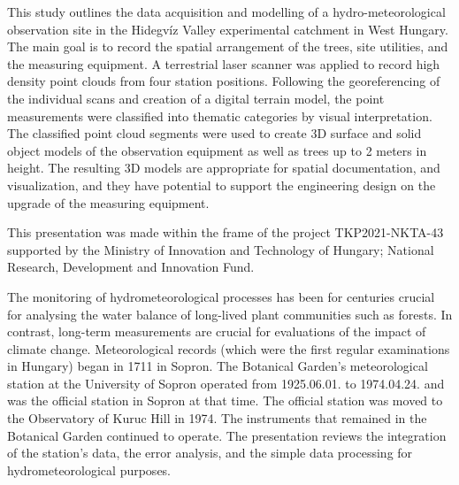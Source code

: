 \noindent

This study outlines the data acquisition and modelling of a hydro-meteorological observation site in the Hidegvíz Valley experimental catchment in West Hungary. The main goal is to record the spatial arrangement of the trees, site utilities, and the measuring equipment. A terrestrial laser scanner was applied to record high density point clouds from four station positions. Following the georeferencing of the individual scans and creation of a digital terrain model, the point measurements were classified into thematic categories by visual interpretation. The classified point cloud segments were used to create 3D surface and solid object models of the observation equipment as well as trees up to 2 meters in height. The resulting 3D models are appropriate for spatial documentation, and visualization, and they have potential to support the engineering design on the upgrade of the measuring equipment.

This presentation was made within the frame of the project TKP2021-NKTA-43 supported by the Ministry of Innovation and Technology of Hungary; National Research, Development and Innovation Fund.



\newpage{}
{}
\begin{flushleft}






\end{flushleft}

\noindent

The monitoring of hydrometeorological processes has been for centuries crucial for analysing the water balance of long-lived plant communities such as forests. In contrast, long-term measurements are crucial for evaluations of the impact of climate change. Meteorological records (which were the first regular examinations in Hungary) began in 1711 in Sopron. The Botanical Garden’s meteorological station at the University of Sopron operated from 1925.06.01. to 1974.04.24. and was the official station in Sopron at that time. The official station was moved to the Observatory of Kuruc Hill in 1974. The instruments that remained in the Botanical Garden continued to operate. The presentation reviews the integration of the station's data, the error analysis, and the simple data processing for hydrometeorological purposes.

